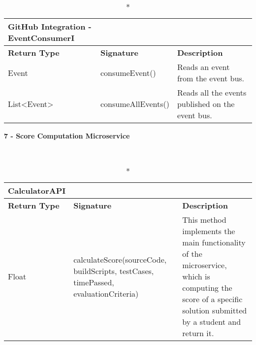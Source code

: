 \begin{longtable}{|p{2.5cm} p{6.5cm} p{4.5cm}|}
	\caption*{GitHub Integration - EventConsumerI}\\ 
	
	\hline
	\textbf{Return Type} & \textbf{Signature} & \textbf{Description}\\
	\hline \endhead
	
	Event & consumeEvent()  & Reads an event from the event bus.\\
	
	List\textless Event\textgreater & consumeAllEvents() & Reads all the events published on the event bus.\\
	
	\hline
	
\end{longtable}

\vspace{1cm}

\begin{large}{\textbf{7 - Score Computation Microservice}}\end{large}\\

\begin{longtable}{|p{2.5cm} p{6.5cm} p{4.5cm}|}
	\caption*{CalculatorAPI}\\ 
	
	\hline
	\textbf{Return Type} & \textbf{Signature} & \textbf{Description}\\
	\hline \endhead
	
	Float & calculateScore(sourceCode, buildScripts, testCases, timePassed, evaluationCriteria) & This method implements the main functionality of the microservice, which is computing the score of a specific solution submitted by a student and return it.\\
	
	\hline
	
\end{longtable}
